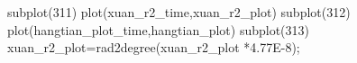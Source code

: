 subplot(311)
plot(xuan_r2_time,xuan_r2_plot)
subplot(312)
plot(hangtian_plot_time,hangtian_plot)
subplot(313)
xuan_r2_plot=rad2degree(xuan_r2_plot *4.77E-8);